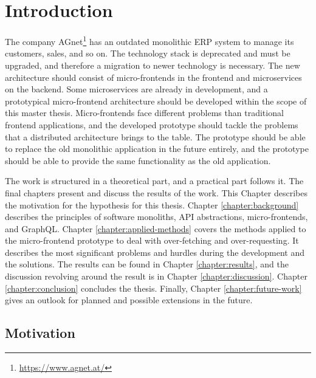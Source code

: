 \chapter{Introduction}\label{chapter:introduction}

The company AGnet\footnote{\url{https://www.agnet.at/}} has an outdated monolithic \ac{ERP} system to manage its customers, sales, and so on. The technology stack is deprecated and must be upgraded, and therefore a migration to newer technology is necessary. The new architecture should consist of micro-frontends in the frontend and microservices on the backend. Some microservices are already in development, and a prototypical micro-frontend architecture should be developed within the scope of this master thesis. Micro-frontends face different problems than traditional frontend applications, and the developed prototype should tackle the problems that a distributed architecture brings to the table. The prototype should be able to replace the old monolithic application in the future entirely, and the prototype should be able to provide the same functionality as the old application.

\bigskip

\noindent The work is structured in a theoretical part, and a practical part follows it. The final chapters present and discuss the results of the work. This Chapter describes the motivation for the hypothesis for this thesis. Chapter \ref{chapter:background} describes the principles of software monoliths, \ac{API} abstractions, micro-frontends, and GraphQL. Chapter \ref{chapter:applied-methods} covers the methods applied to the micro-frontend prototype to deal with over-fetching and over-requesting. It describes the most significant problems and hurdles during the development and the solutions. The results can be found in Chapter \ref{chapter:results}, and the discussion revolving around the result is in Chapter \ref{chapter:discussion}. Chapter \ref{chapter:conclusion} concludes the thesis. Finally, Chapter \ref{chapter:future-work} gives an outlook for planned and possible extensions in the future.

\section{Motivation}\label{section:introduction:motivation}

